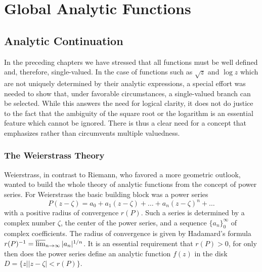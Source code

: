 \chapter{Global Analytic Functions}\label{chap:8}

\setcounter{section}{0}\section{Analytic Continuation}\label{sec:8.1}
In the preceding chapters we have stressed that all functions must be well defined and, therefore, single-valued. In the case of functions such as $\sqrt{z}$ and $\log z$ which are not uniquely determined by their analytic expressions, a special effort was needed to show that, under favorable circumstances, a single-valued branch can be selected. While this answers the need for logical clarity, it does not do justice to the fact that the ambiguity of the square root or the logarithm is an essential feature which cannot be ignored. There is thus a clear need for a concept that emphasizes rather than circumvents multiple valuedness.

\setcounter{section}{1}\setcounter{subsection}{0}\subsection{The Weierstrass Theory}\label{sec:8.1.1}
Weierstrass, in contrast to Riemann, who favored a more geometric outlook, wanted to build the whole theory of analytic functions from the concept of power series. For Weierstrass the basic building block was a power series
\begin{equation*}
P (z - \zeta) = a _ {0} + a _ {1} (z - \zeta) + \dots + a _ {n} (z - \zeta) ^ {n} + \dots
\end{equation*}
with a positive radius of convergence $r(P)$. Such a series is determined by a complex number $\zeta$, the center of the power series, and a sequence $\{a_n\}_0^\infty$ of complex coefficients. The radius of convergence is given by Hadamard's formula $r(P)^{-1} = \varlimsup_{n\to \infty}|a_n|^{1 / n}$. It is an essential requirement that $r(P) > 0$, for only then does the power series define an analytic function $f(z)$ in the disk $D = \{z||z - \zeta| < r(P)\}$.


